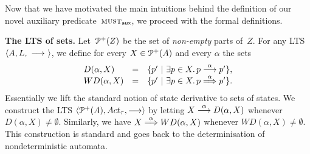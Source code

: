 Now that we have motivated the main intuitions behind the definition of our
novel auxiliary predicate~$\operatorname{\textsc{must}}_{\textsf{aux}}$, we proceed with the formal definitions.

{\bfseries The LTS of sets.}
Let~$\mathcal{P}^{+}( Z )$ be the set of  {\em non-empty} parts of~$Z$.
For any LTS~$\langle A,  L , ~\mathrel{\overset{}\longrightarrow}~ \rangle$, we define
for every $ X \in \mathcal{P}^{+}( A ) $ and every $\alpha$ the sets
$$
\begin{array}{lll}
D{(\alpha, X)} & = & \{  p'  \ |\  \exists p \in X . \, p \mathrel{\overset{\alpha}\longrightarrow} p'  \},\\
WD{(\alpha, X)} & = & \{  p'  \ |\  \exists p \in X . \, p \mathrel{\overset{\alpha} \Longrightarrow} p'  \}.
\end{array}
$$
Essentially we lift the standard notion of state derivative to sets of states.
We construct the LTS $\lts{\pparts{ \States }}{ \Acttau }{ \st{} }$
by letting $ X \mathrel{\overset{ \alpha }\longrightarrow} D{(\alpha, X)}$ whenever $D{(\alpha, X)} \neq \emptyset$.
Similarly, we have $X \mathrel{\overset{ \alpha } \Longrightarrow} WD{(\alpha, X)}$ whenever $WD{(\alpha, X)} \neq \emptyset$.
This construction is standard \cite{DBLP:conf/avmfss/CleavelandH89,DBLP:conf/aplas/BonchiCPS13,DBLP:journals/lmcs/BonchiSV22}
  and goes back to the determinisation of nondeterministic automata.

